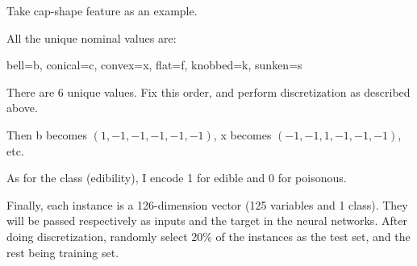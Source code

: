 \documentclass[runningheads]{llncs}
\begin{document}
Take cap-shape feature as an example.

\qquad All the unique nominal values are:

\qquad\qquad bell=b, conical=c, convex=x, flat=f, knobbed=k, sunken=s

\qquad There are 6 unique values. Fix this order, and perform discretization as described above.

\qquad Then b becomes $(1, -1, -1, -1, -1, -1)$, x becomes $(-1, -1, 1, -1, -1, -1)$, etc.

As for the class (edibility), I encode 1 for edible and 0 for poisonous.

Finally, each instance is a 126-dimension vector (125 variables and 1 class). They will be passed respectively as inputs and the target in the neural networks. After doing discretization, randomly select 20\% of the instances as the test set, and the rest being training set.
\end{document}
